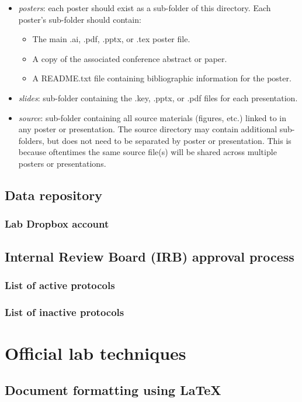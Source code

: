 \documentclass{tufte-book} %
\begin{document}
\begin{itemize}
\item \textit{posters}: each poster should exist as a sub-folder
  of this directory.  Each poster's sub-folder should contain:
\begin{itemize}
  \item The main .ai, .pdf, .pptx, or .tex poster file.
  \item A copy of the associated conference abstract or paper.
  \item A README.txt file containing bibliographic information for the
    poster.
\end{itemize}
\item \textit{slides}: sub-folder containing the .key, .pptx, or
  .pdf files for each presentation.
\item \textit{source}: sub-folder containing all source
  materials (figures, etc.) linked to in any poster or presentation.  The source
  directory may contain additional sub-folders, but does not need
  to be separated by poster or presentation.  This is because oftentimes the
  same source file(s) will be shared across multiple posters or presentations.
\end{itemize}

 \section{Data repository}
 \subsection{Lab Dropbox account}

 \section{Internal Review Board (IRB) approval process}
 \subsection{List of active protocols}
 \subsection{List of inactive protocols}


 \chapter{Official lab techniques}\label{ch:techniques}
 \section{Document formatting using \LaTeX}
\end{document}
